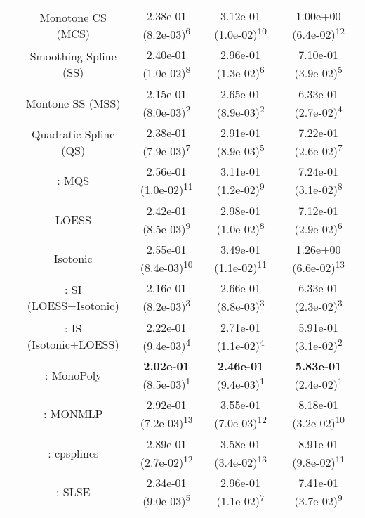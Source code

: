 \begin{tabular}{ccccc}
&Monotone CS (MCS)& 2.38e-01 (8.2e-03)\textsuperscript{6}& 3.12e-01 (1.0e-02)\textsuperscript{10}& 1.00e+00 (6.4e-02)\textsuperscript{12}\tabularnewline
&Smoothing Spline (SS)& 2.40e-01 (1.0e-02)\textsuperscript{8}& 2.96e-01 (1.3e-02)\textsuperscript{6}& 7.10e-01 (3.9e-02)\textsuperscript{5}\tabularnewline
&Montone SS (MSS)& 2.15e-01 (8.0e-03)\textsuperscript{2}& 2.65e-01 (8.9e-03)\textsuperscript{2}& 6.33e-01 (2.7e-02)\textsuperscript{4}\tabularnewline
&Quadratic Spline (QS)& 2.38e-01 (7.9e-03)\textsuperscript{7}& 2.91e-01 (8.9e-03)\textsuperscript{5}& 7.22e-01 (2.6e-02)\textsuperscript{7}\tabularnewline
&\textcite{heMonotoneBsplineSmoothing1998}: MQS& 2.56e-01 (1.0e-02)\textsuperscript{11}& 3.11e-01 (1.2e-02)\textsuperscript{9}& 7.24e-01 (3.1e-02)\textsuperscript{8}\tabularnewline
&LOESS& 2.42e-01 (8.5e-03)\textsuperscript{9}& 2.98e-01 (1.0e-02)\textsuperscript{8}& 7.12e-01 (2.9e-02)\textsuperscript{6}\tabularnewline
&Isotonic& 2.55e-01 (8.4e-03)\textsuperscript{10}& 3.49e-01 (1.1e-02)\textsuperscript{11}& 1.26e+00 (6.6e-02)\textsuperscript{13}\tabularnewline
&\textcite{mammenEstimatingSmoothMonotone1991}: SI (LOESS+Isotonic)& 2.16e-01 (8.2e-03)\textsuperscript{3}& 2.66e-01 (8.8e-03)\textsuperscript{3}& 6.33e-01 (2.3e-02)\textsuperscript{3}\tabularnewline
&\textcite{mammenEstimatingSmoothMonotone1991}: IS (Isotonic+LOESS)& 2.22e-01 (9.4e-03)\textsuperscript{4}& 2.71e-01 (1.1e-02)\textsuperscript{4}& 5.91e-01 (3.1e-02)\textsuperscript{2}\tabularnewline
&\textcite{murrayFastFlexibleMethods2016a}: MonoPoly& \textbf{2.02e-01} (8.5e-03)\textsuperscript{1}& \textbf{2.46e-01} (9.4e-03)\textsuperscript{1}& \textbf{5.83e-01} (2.4e-02)\textsuperscript{1}\tabularnewline
&\textcite{cannonMonmlpMultilayerPerceptron2017}: MONMLP& 2.92e-01 (7.2e-03)\textsuperscript{13}& 3.55e-01 (7.0e-03)\textsuperscript{12}& 8.18e-01 (3.2e-02)\textsuperscript{10}\tabularnewline
&\textcite{navarro-garciaConstrainedSmoothingOutofrange2023}: cpsplines& 2.89e-01 (2.7e-02)\textsuperscript{12}& 3.58e-01 (3.4e-02)\textsuperscript{13}& 8.91e-01 (9.8e-02)\textsuperscript{11}\tabularnewline
&\textcite{groeneboomConfidenceIntervalsMonotone2023}: SLSE& 2.34e-01 (9.0e-03)\textsuperscript{5}& 2.96e-01 (1.1e-02)\textsuperscript{7}& 7.41e-01 (3.7e-02)\textsuperscript{9}\tabularnewline
\bottomrule
\end{tabular}
